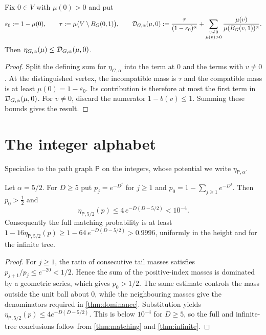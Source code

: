 \begin{corollary}
\label{thm:dominance}
\leanok
{}
Fix $0\in V$ with $\mu(0)>0$ and put
\[
 \varepsilon_0:=1-\mu(0),
 \qquad
 \tau:=\mu\bigl(V\setminus B_G(0,1)\bigr),
 \qquad
 \mathcal{D}_{G,\alpha}(\mu,0):=
 \frac{\tau}{(1-\varepsilon_0)^{\alpha}}
 +\sum_{\substack{v\neq0\\ \mu(v)>0}}\frac{\mu(v)}{\mu(B_G(v,1))^{\alpha}} .
\]
Then $\eta_{G,\alpha}(\mu)\leq\mathcal{D}_{G,\alpha}(\mu,0)$.
\end{corollary}

\begin{proof}
\leanok
Split the defining sum for $\eta_{G,\alpha}$ into the term at $0$ and the terms with
$v\neq0$. At the distinguished vertex, the incompatible mass is $\tau$ and the compatible
mass is at least $\mu(0)=1-\varepsilon_0$. Its contribution is therefore at most the first
term in $\mathcal{D}_{G,\alpha}(\mu,0)$. For $v\neq0$, discard the numerator $1-b(v)\leq1$. Summing
these bounds gives the result.
\end{proof}

\section{The integer alphabet}

Specialise to the path graph $\mathsf P$ on the integers, whose potential we write
$\eta_{\mathsf P,\alpha}$.

\begin{corollary}
\label{thm:double-exp}
\leanok
Let $\alpha=5/2$. For $D\geq5$ put $p_j=e^{-D^j}$ for $j\geq1$ and
$p_0=1-\sum_{j\geq1}e^{-D^j}$. Then $p_0>\tfrac12$ and
\[
 \eta_{\mathsf P,5/2}(p)\leq4\,e^{-D(D-5/2)}<10^{-4} .
\]
Consequently the full matching probability is at least
$1-16\eta_{\mathsf P,5/2}(p)\geq1-64\,e^{-D(D-5/2)}>0.9996$, uniformly in the height and
for the infinite tree.
\end{corollary}

\begin{proof}
\leanok
{}
For $j\geq1$, the ratio of consecutive tail masses satisfies
$p_{j+1}/p_j\leq e^{-20}<1/2$. Hence the sum of the positive-index masses is dominated by a
geometric series, which gives $p_0>1/2$. The same estimate controls the mass outside the unit
ball about $0$, while the neighbouring masses give the denominators required in
\cref{thm:dominance}. Substitution yields
$\eta_{\mathsf P,5/2}(p)\leq4e^{-D(D-5/2)}$. This is below $10^{-4}$ for $D\geq5$, so the
full and infinite-tree conclusions follow from \cref{thm:matching} and \cref{thm:infinite}.
\end{proof}
